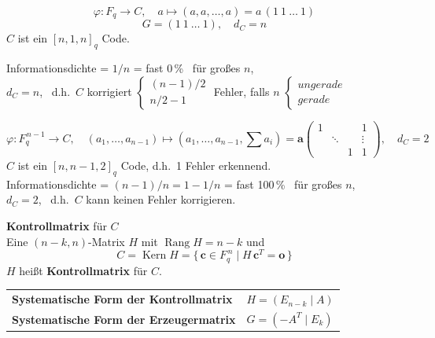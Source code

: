\begin{beispiel}[Wiederholungscode]
\[ \varphi : F_q \to C, \quad a \mapsto (a, a, \dots, a) = a\,(1\ 1\ \dots\ 1) \]
\[ G = (1\ 1\ \dots\ 1), \quad d_C = n \]
$C$ ist ein $[n, 1, n]_q$ Code.

Informationsdichte = $1/n$ = fast 0\,\% \ für großes $n$,\\
$d_C = n$, \ d.h.\ $C$ korrigiert
$\begin{cases} (n-1)/2 \\ n/2 - 1 \end{cases}$
Fehler, falls $n$
$\begin{cases} \textit{ungerade} \\ \textit{gerade} \end{cases}$
\end{beispiel}

\begin{beispiel}[Paritätscode]
\[ \varphi : F_q^{\,n-1} \to C, \quad (a_1, \dots, a_{n-1}) \mapsto (a_1, \dots, a_{n-1}, \textstyle\sum a_i) = \mathbf{a}
\begin{pmatrix} 1 & & & 1 \\ & \ddots & & \vdots \\ & & 1 & 1 \end{pmatrix}, \quad d_C = 2 \]
$C$ ist ein $[n, n-1, 2]_q$ Code, \quad d.h.\ 1 Fehler erkennend.\\
Informationsdichte = $(n-1)/n = 1 - 1/n$ = fast 100\,\% \ für großes $n$,\\
$d_C = 2$, \ d.h.\ $C$ kann keinen Fehler korrigieren.
\end{beispiel}

\begin{definition}[Kontrollmatrix]
\textbf{Kontrollmatrix} für $C$\\
Eine $(n-k, n)$-Matrix $H$ mit $\operatorname{Rang} H = n - k$ und
\[ C = \operatorname{Kern} H = \{\, \mathbf{c} \in F_q^{\,n} \mid H\,\mathbf{c}^T = \mathbf{o} \,\} \]
$H$ heißt \textbf{Kontrollmatrix} für $C$.
\end{definition}

\begin{tabular}{ll}
\textbf{Systematische Form der Kontrollmatrix} & $H = (E_{n-k} \mid A)$ \\
\textbf{Systematische Form der Erzeugermatrix} & $G = (-A^T \mid E_k)$ \\
\end{tabular}

